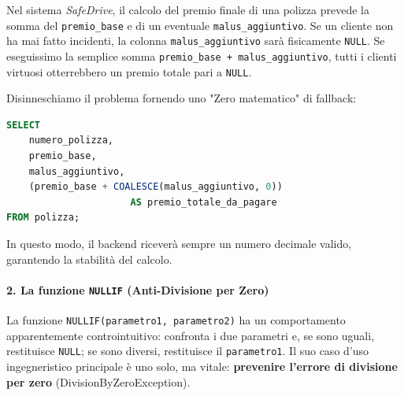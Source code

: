 \begin{example}
Nel sistema \textit{SafeDrive}, il calcolo del premio finale di una polizza prevede la somma del \texttt{premio\_base} e di un eventuale \texttt{malus\_aggiuntivo}. Se un cliente non ha mai fatto incidenti, la colonna \texttt{malus\_aggiuntivo} sarà fisicamente \texttt{NULL}.
Se eseguissimo la semplice somma \texttt{premio\_base + malus\_aggiuntivo}, tutti i clienti virtuosi otterrebbero un premio totale pari a \texttt{NULL}.

Disinneschiamo il problema fornendo uno "Zero matematico" di fallback:
\begin{lstlisting}[language=SQL, basicstyle=\ttfamily\small, keywordstyle=\color{blue}\bfseries]
SELECT 
    numero_polizza,
    premio_base,
    malus_aggiuntivo,
    (premio_base + COALESCE(malus_aggiuntivo, 0))
                      AS premio_totale_da_pagare
FROM polizza;
\end{lstlisting}
In questo modo, il backend riceverà sempre un numero decimale valido, garantendo la stabilità del calcolo.
\end{example}

\paragraph{2. La funzione \texttt{NULLIF} (Anti-Divisione per Zero)}
La funzione \texttt{NULLIF(parametro1, parametro2)} ha un comportamento apparentemente controintuitivo: confronta i due parametri e, se sono uguali, restituisce \texttt{NULL}; se sono diversi, restituisce il \texttt{parametro1}. 
Il suo caso d'uso ingegneristico principale è uno solo, ma vitale: \textbf{prevenire l'errore di divisione per zero} (DivisionByZeroException).

